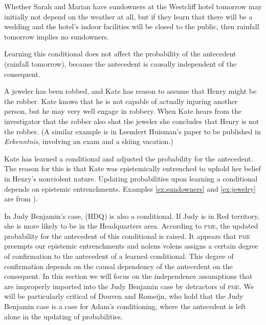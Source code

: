\documentclass[phd,12pt,oneside]{ubcthesis}
\begin{document}
\begin{quotex}
  \label{ex:sundowners} Whether
  Sarah and Marian have sundowners at the Westcliff hotel tomorrow may
  initially not depend on the weather at all, but if they learn that
  there will be a wedding and the hotel's indoor facilities will be
  closed to the public, then rainfall tomorrow implies no
  sundowners.\label{page:oquohsae}
\end{quotex}

Learning this conditional does not affect the probability of the
antecedent (rainfall tomorrow), because the antecedent is causally
independent of the consequent.

\begin{quotex}
  \label{ex:jewelry} A jeweler has been robbed, and
  Kate has reason to assume that Henry might be the robber. Kate knows
  that he is not capable of actually injuring another person, but he
  may very well engage in robbery. When Kate hears from the
  investigator that the robber also shot the jeweler she concludes
  that Henry is not the robber. (A similar example is in Leendert
  Huisman's paper  to be published in \emph{Erkenntnis}, involving an
  exam and a skiing vacation.)
\end{quotex}

Kate has learned a conditional and adjusted the probability for the
antecedent. The reason for this is that Kate was epistemically
entrenched to uphold her belief in Henry's nonviolent nature. Updating
probabilities upon learning a conditional depends on epistemic
entrenchments. Examples \ref{ex:sundowners} and \ref{ex:jewelry} are
from ).

In Judy Benjamin's case, (HDQ) is also a conditional. If Judy is in
Red territory, she is more likely to be in the Headquarters area.
According to \textsc{pme}, the updated probability for the
antecedent of this conditional is raised. It appears that
\textsc{pme} preempts our epistemic entrenchments and nolens volens
assigns a certain degree of confirmation to the antecedent of a
learned conditional. This degree of confirmation depends on the
causal dependency of the antecedent on the consequent. In this
section we will focus on the independence assumptions that are
improperly imported into the Judy Benjamin case by detractors of
\textsc{pme}. We will be particularly critical of Douven and
Romeijn, who hold that the Judy Benjamin case is a case for Adam's
conditioning, where the antecedent is left alone in the updating of
probabilities.
\end{document}
